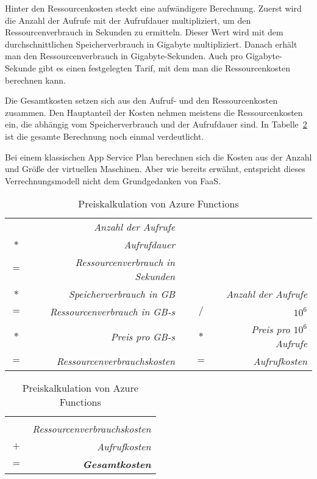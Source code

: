 Hinter den Ressourcenkosten steckt eine aufwändigere Berechnung. Zuerst wird die Anzahl der Aufrufe mit der Aufrufdauer multipliziert, um den Ressourcenverbrauch in Sekunden zu ermitteln. Dieser Wert wird mit dem durchschnittlichen Speicherverbrauch in Gigabyte multipliziert. Danach erhält man den Ressourcenverbrauch in Gigabyte-Sekunden. Auch pro Gigabyte-Sekunde gibt es einen festgelegten Tarif, mit dem man die Ressourcenkosten berechnen kann.

Die Gesamtkosten setzen sich aus den Aufruf- und den Ressourcenkosten zusammen. Den Hauptanteil der Kosten nehmen meistens die Ressourcenkosten ein, die abhängig vom Speicherverbrauch und der Aufrufdauer sind. In Tabelle~\ref{tab:azfun-pricing} ist die gesamte Berechnung noch einmal verdeutlicht.

Bei einem klassischen App Service Plan berechnen sich die Kosten aus der Anzahl und Größe der virtuellen Maschinen. Aber wie bereits erwähnt, entspricht dieses Verrechnungsmodell nicht dem Grundgedanken von FaaS.

\begin{table}[!hbt]
\caption{Preiskalkulation von Azure Functions}
\label{tab:azfun-pricing}
\centering

\begin{tabular}{crccr}
& \textit{Anzahl der Aufrufe} & & & \\
$*$ & \textit{Aufrufdauer} & & & \\
\cline{1-2}
$=$ & \textit{Ressourcenverbrauch in Sekunden} & & & \\
$*$ & \textit{Speicherverbrauch in GB} & & & \textit{Anzahl der Aufrufe} \\
\cline{1-2}
$=$ & \textit{Ressourcenverbrauch in GB-s} & & $/$ & $10^6$ \\
$*$ & \textit{Preis pro GB-s} & & $*$ & \textit{Preis pro $10^6$ Aufrufe} \\
\cline{1-2}\cline{4-5}
$=$ & \textit{Ressourcenverbrauchskosten} & & $=$ & \textit{Aufrufkosten} \\
\end{tabular}

\begin{tabular}{cr}
 & \\
& \textit{Ressourcenverbrauchskosten} \\
$+$ & \textit{Aufrufkosten} \\
\hline
$=$ & \textit{\textbf{Gesamtkosten}} \\
\hline\hline
\end{tabular}

\end{table}


